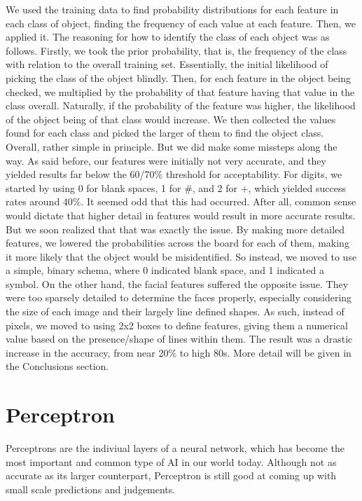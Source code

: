 \documentclass{article}
\begin{document}
We used the training data to find probability distributions for each feature in each class of object, finding the frequency of each value at each feature. Then, we applied it. The reasoning for how to identify the class of each object was as follows. Firstly, we took the prior probability, that is, the frequency of the class with relation to the overall training set. Essentially, the initial likelihood of picking the class of the object blindly. Then, for each feature in the object being checked, we multiplied by the probability of that feature having that value in the class overall. Naturally, if the probability of the feature was higher, the likelihood of the object being of that class would increase. We then collected the values found for each class and picked the larger of them to find the object class.
Overall, rather simple in principle. But we did make some missteps along the way. As said before, our features were initially not very accurate, and they yielded results far below the 60/70\% threshold for acceptability. For digits, we started by using 0 for blank spaces, 1 for #, and 2 for +, which yielded success rates around 40\%. It seemed odd that this had occurred. After all, common sense would dictate that higher detail in features would result in more accurate results. But we soon realized that that was exactly the issue. By making more detailed features, we lowered the probabilities across the board for each of them, making it more likely that the object would be misidentified. So instead, we moved to use a simple, binary schema, where 0 indicated blank space, and 1 indicated a symbol.
On the other hand, the facial features suffered the opposite issue. They were too sparsely detailed to determine the faces properly, especially considering the size of each image and their largely line defined shapes. As such, instead of pixels, we moved to using 2x2 boxes to define features, giving them a numerical value based on the presence/shape of lines within them. The result was a drastic increase in the accuracy, from near 20\% to high 80s. More detail will be given in the Conclusions section.  

\section{Perceptron}
Perceptrons are the indiviual layers of a neural network, which has become the most important and common type of AI in our world today. Although not as accurate as its larger counterpart, Perceptron is still good at coming up with small scale predictions and judgements.
\end{document}

